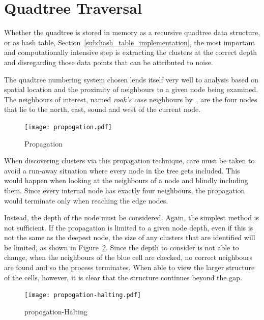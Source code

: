 
\section{Quadtree Traversal}
\label{sec:quadtree_traversal}

Whether the quadtree is stored in memory as a recursive quadtree data
structure, or as hash table, Section~\ref{sub:hash_table_implementation}, the
most important and computationally intensive step is extracting the clusters at
the correct depth and disregarding those data points that can be attributed to
noise.

The quadtree numbering system chosen lends itself very well to analysis based
on spatial location and the proximity of neighbours to a given node being
examined. The neighbours of interest, named \emph{rook's case} neighbours
by~\cite{abel1990comparative}, are the four nodes that lie to the north, east,
sound and west of the current node.

\begin{figure}[tbhp]
	\centering
	\texttt{[image: propogation.pdf]}
	\caption{Propagation}
	\label{fig:propogation}
\end{figure}

When discovering clusters via this propagation technique, care must be taken to
avoid a run-away situation where every node in the tree gets included. This
would happen when looking at the neighbours of a node and blindly including
them. Since every internal node has exactly four neighbours, the propagation
would terminate only when reaching the edge nodes.

Instead, the depth of the node must be considered. Again, the simplest method
is not sufficient. If the propagation is limited to a given node depth, even if
this is not the same as the deepest node, the size of any clusters that are
identified will be limited, as shown in Figure~\ref{fig:propogation-halting}.
Since the depth to consider is not able to change, when the neighbours of the
blue cell are checked, no correct neighbours are found and so the process
terminates. When able to view the larger structure of the cells, however, it is
clear that the structure continues beyond the gap.

\begin{figure}[tbhp]
	\centering
	\texttt{[image: propogation-halting.pdf]}
	\caption{propogation-Halting}
	\label{fig:propogation-halting}
\end{figure}

